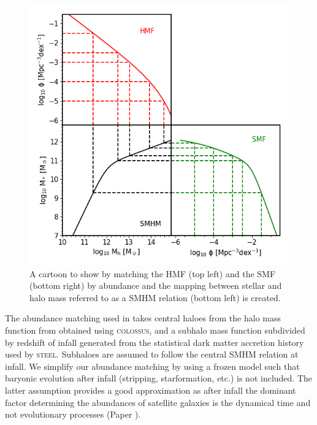 \begin{figure}[h]
	\centering
	\includegraphics[width = \linewidth]{Figures/Chapter2/AbundaceMatching.png}
    \caption{A cartoon to show by matching the HMF (top left) and the SMF (bottom right) by abundance and the mapping between stellar and halo mass referred to as a SMHM relation (bottom left) is created.}
	\label{fig:Abn_Toon}
\end{figure}

The abundance matching used in \steel takes central haloes from the halo mass function from \citet{Despali2016TheDefinitions} obtained using \textsc{colossus}\cite{Diemer2017COLOSSUS:Halos}, and a subhalo mass function subdivided by redshift of infall generated from the statistical dark matter accretion history used by \textsc{steel}. Subhaloes are assumed to follow the central SMHM relation at infall. We simplify our abundance matching by using a frozen model such that baryonic evolution after infall (stripping, starformation, etc.) is not included. The latter assumption provides a good approximation as after infall the dominant factor determining the abundances of satellite galaxies is the dynamical time and not evolutionary processes (Paper ).

